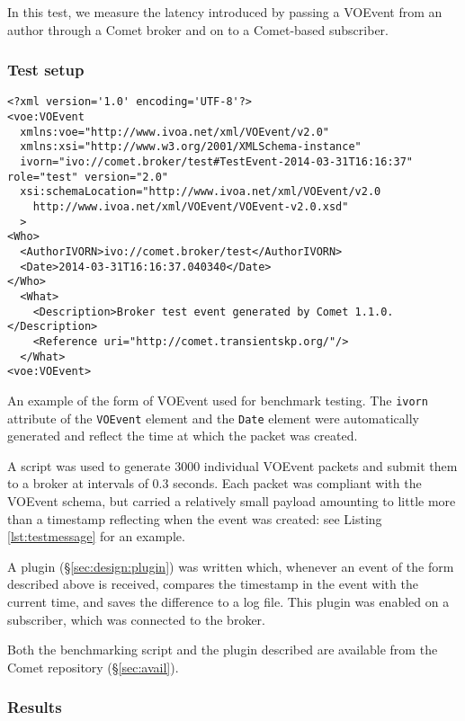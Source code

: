 \documentclass[5p,authoryear]{elsarticle}
\begin{document}
In this test, we measure the latency introduced by passing a VOEvent from an
author through a Comet broker and on to a Comet-based subscriber.

\subsubsection{Test setup}
\label{sec:perf:latency:setup}

\begin{listing*}
\begin{verbatim}
<?xml version='1.0' encoding='UTF-8'?>
<voe:VOEvent
  xmlns:voe="http://www.ivoa.net/xml/VOEvent/v2.0"
  xmlns:xsi="http://www.w3.org/2001/XMLSchema-instance"
  ivorn="ivo://comet.broker/test#TestEvent-2014-03-31T16:16:37" role="test" version="2.0"
  xsi:schemaLocation="http://www.ivoa.net/xml/VOEvent/v2.0
    http://www.ivoa.net/xml/VOEvent/VOEvent-v2.0.xsd"
  >
<Who>
  <AuthorIVORN>ivo://comet.broker/test</AuthorIVORN>
  <Date>2014-03-31T16:16:37.040340</Date>
</Who>
  <What>
    <Description>Broker test event generated by Comet 1.1.0.</Description>
    <Reference uri="http://comet.transientskp.org/"/>
  </What>
<voe:VOEvent>
\end{verbatim}
\caption{An example of the form of VOEvent used for benchmark testing. The
\texttt{ivorn} attribute of the \texttt{VOEvent} element and the \texttt{Date}
element were automatically generated and reflect the time at which the packet
was created.}
\label{lst:testmessage}
\end{listing*}

A script was used to generate 3000 individual VOEvent packets and submit them
to a broker at intervals of 0.3 seconds.  Each packet was compliant with the
VOEvent schema, but carried a relatively small payload amounting to little
more than a timestamp reflecting when the event was created: see Listing
\ref{lst:testmessage} for an example.

A plugin (\S\ref{sec:design:plugin}) was written which, whenever an event of
the form described above is received, compares the timestamp in the event with
the current time, and saves the difference to a log file. This plugin was
enabled on a subscriber, which was connected to the broker.

Both the benchmarking script and the plugin described are available from the
Comet repository (\S\ref{sec:avail}).

\subsubsection{Results}
\end{document}
